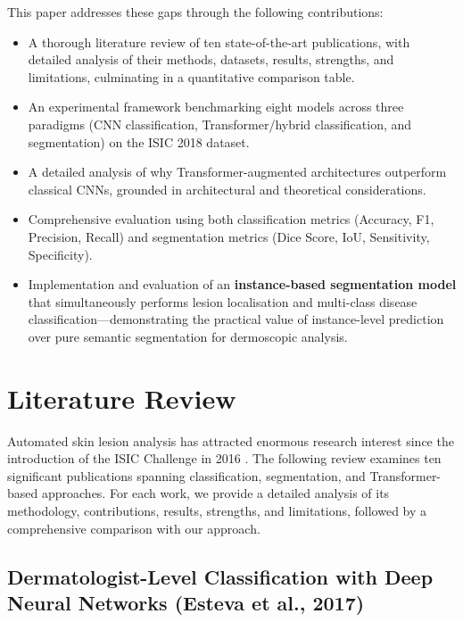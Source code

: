\documentclass[10pt,twocolumn]{article}
\begin{document}
This paper addresses these gaps through the following contributions:
\begin{itemize}
  \item A thorough literature review of ten state-of-the-art publications, with detailed analysis of their methods, datasets, results, strengths, and limitations, culminating in a quantitative comparison table.
  \item An experimental framework benchmarking eight models across three paradigms (CNN classification, Transformer/hybrid classification, and segmentation) on the ISIC 2018 dataset.
  \item A detailed analysis of why Transformer-augmented architectures outperform classical CNNs, grounded in architectural and theoretical considerations.
  \item Comprehensive evaluation using both classification metrics (Accuracy, F1, Precision, Recall) and segmentation metrics (Dice Score, IoU, Sensitivity, Specificity).
  \item Implementation and evaluation of an \textbf{instance-based segmentation model} that simultaneously performs lesion localisation and multi-class disease classification---demonstrating the practical value of instance-level prediction over pure semantic segmentation for dermoscopic analysis.
\end{itemize}

\section{Literature Review}

Automated skin lesion analysis has attracted enormous research interest since the introduction of the ISIC Challenge in 2016 \cite{Codella2018}. The following review examines ten significant publications spanning classification, segmentation, and Transformer-based approaches. For each work, we provide a detailed analysis of its methodology, contributions, results, strengths, and limitations, followed by a comprehensive comparison with our approach.

\subsection{Dermatologist-Level Classification with Deep Neural Networks (Esteva et al., 2017)}
\end{document}
